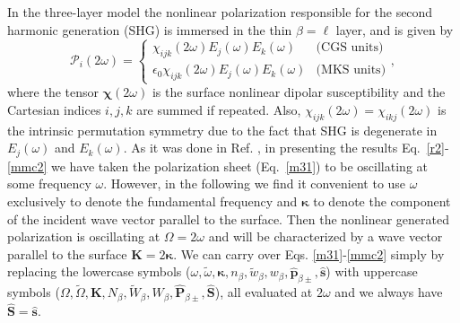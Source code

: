 In the three-layer model the nonlinear polarization responsible for the second harmonic generation (SHG) is immersed in the thin $\beta=\ell$ layer, and is given by
\begin{equation}\label{tres}
\mathcal{P}_i(2\omega)=
\left\{
\begin{array}{cc}
\chi_{ijk}(2\omega)E_{j}(\omega)E_{k}(\omega) & \text{(CGS units)} \\
\epsilon_{0}\chi_{ijk}(2\omega)E_{j}(\omega)E_{k}(\omega) & \text{(MKS units)}
\end{array}
\right.
,
\end{equation}
where the tensor $\boldsymbol{\chi}(2\omega)$ is the surface nonlinear dipolar susceptibility and the Cartesian indices $i,j,k$ are summed if repeated. Also, $\chi_{ijk}(2\omega)=\chi_{ikj}(2\omega)$ is the intrinsic permutation symmetry due to the fact that SHG is degenerate in $E_j(\omega)$ and $E_k(\omega)$. As it was done in Ref. \cite{mizrahiJOSA88}, in presenting the results Eq.~\eqref{r2}-\eqref{mmc2} we have taken the polarization sheet (Eq.~\eqref{m31}) to be oscillating at some frequency $\omega$. However, in the following we find it convenient to use $\omega$ exclusively to denote the fundamental frequency and $\boldsymbol{\kappa}$ to denote the component of the incident wave vector parallel to the surface. Then the nonlinear generated polarization is oscillating at $\Omega= 2\omega$ and will be characterized by a wave vector parallel to the surface $\mathbf{K}=2\boldsymbol{\kappa}$. We can carry over Eqs. \eqref{m31}-\eqref{mmc2} simply by replacing the lowercase symbols ($\omega,\tilde\omega,\boldsymbol{\kappa},n_{\beta},\tilde w_{\beta},w_{\beta},\hat{\mathbf{p}}_{\beta\pm},\hat{\mathbf{s}}$) with uppercase symbols ($\Omega,\tilde\Omega,\mathbf{K},N_{\beta},\tilde W_{\beta},W_{\beta},\hat{\mathbf{P}}_{\beta\pm},\hat{\mathbf{S}}$), all evaluated at $2\omega$ and we always have $\hat{\mathbf{S}}=\hat{\mathbf{s}}$.


